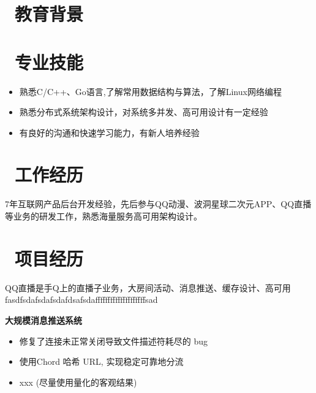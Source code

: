 \documentclass{resume}
\begin{document}


 
\section{\faGraduationCap\ 教育背景}

\section{\faCogs\ 专业技能}
\begin{itemize}[parsep=0.5ex]
  \item 熟悉C/C++、Go语言,了解常用数据结构与算法，了解Linux网络编程
  \item 熟悉分布式系统架构设计，对系统多并发、高可用设计有一定经验
  \item 有良好的沟通和快速学习能力，有新人培养经验
\end{itemize}

\section{\faUsers\ 工作经历}
{7年互联网产品后台开发经验，先后参与QQ动漫、波洞星球二次元APP、QQ直播等业务的研发工作，熟悉海量服务高可用架构设计。}

\section{\faThList\ 项目经历}
{QQ直播是手Q上的直播子业务，大房间活动、消息推送、缓存设计、高可用fasdfsdafsdafsdafdsafsdaffffffffffffffffffffsad} \\
\begin{onehalfspacing}
\textbf{大规模消息推送系统}
\begin{itemize}
  \item 修复了连接未正常关闭导致文件描述符耗尽的 bug
  \item 使用Chord 哈希 URL, 实现稳定可靠地分流
  \item xxx (尽量使用量化的客观结果)
\end{itemize}
\end{onehalfspacing}
\end{document}
